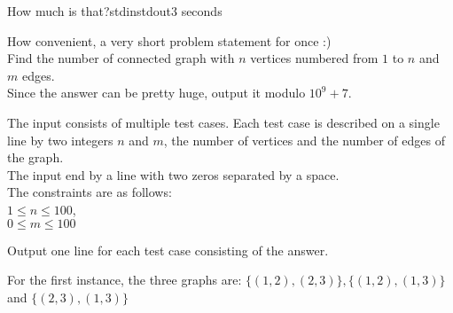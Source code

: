 \begin{problem}{How much is that?}{stdin}{stdout}{3 seconds}


How convenient, a very short problem statement for once :)\\ 
Find the number of connected graph with $n$ vertices numbered from $1$ to $n$ and $m$ edges.\\
Since the answer can be pretty huge, output it modulo $10^9+7$.

\InputFile

The input consists of multiple test cases.
Each test case is described on a single line by two integers $n$ and $m$, the number of vertices and the number of edges of the graph.\\
The input end by a line with two zeros separated by a space.\\ 

The constraints are as follows:\\ 
$1\le n \le 100$,\\ 
$0\le m \le 100$ 

\OutputFile

Output one line for each test case consisting of the answer.

\Example

\begin{examplewide}
%
\end{examplewide}

For the first instance, the three graphs are:
$\{(1,2),(2,3)\}, \{(1,2),(1,3)\}$ and $\{(2,3),(1,3)\}$

\end{problem}

